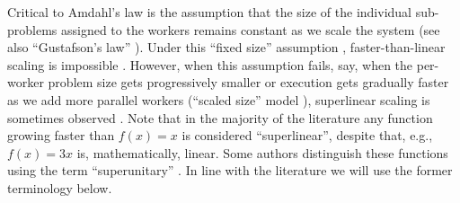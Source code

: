 Critical to Amdahl's law is the assumption that the size of the individual sub-problems assigned to the workers remains constant as we scale the system (see also ``Gustafson's law'' \cite{10.1145/42411.42415}). Under this ``fixed size'' assumption \cite{556383}, faster-than-linear scaling is impossible \cite{10.1016/0167-8191(86)90024-4}. However, when this assumption fails, say, when the per-worker problem size gets progressively smaller or execution gets gradually faster as we add more parallel workers (``scaled size'' model \cite{556383}), superlinear scaling is sometimes observed \cite{scalability-analyzed, sdn-analytitcs, 6483679, 10.1007/978-3-319-77610-1, dobb-1, dobb-2}. Note that in the majority of the literature any function growing faster than $f(x) = x$ is considered ``superlinear'', despite that, e.g., $f(x) = 3x$ is, mathematically, linear. Some authors distinguish these functions using the term ``superunitary'' \cite{80148}. In line with the literature we will use the former terminology below.



